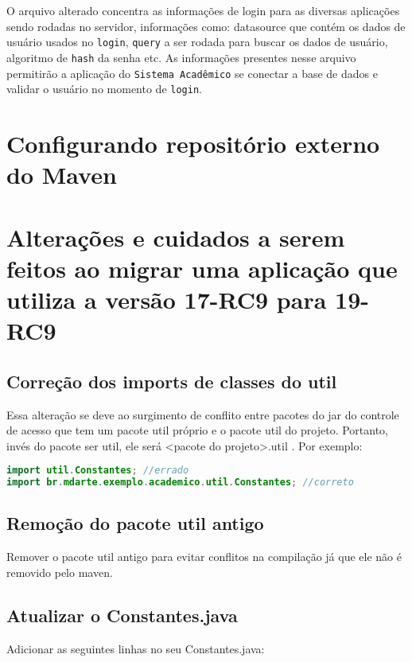 \begin{framed}
	
\end{framed}

O arquivo alterado concentra as informações de login para as diversas aplicações
sendo rodadas no servidor, informações como: datasource que contém os dados de
usuário usados no \texttt{login}, \texttt{query} a ser rodada para buscar os
dados de usuário, algoritmo de \texttt{hash} da senha etc. As informações
presentes nesse arquivo permitirão a aplicação do \texttt{Sistema Acadêmico} se
conectar a base de dados e validar o usuário no momento de \texttt{login}.

\chapter{Configurando repositório externo do Maven}
\label{maven-config}

\chapter{Alterações e cuidados a serem feitos ao migrar uma aplicação que
utiliza a versão 17-RC9 para 19-RC9}

\section{Correção dos imports de classes do util}
Essa alteração se deve ao surgimento de conflito entre pacotes do jar do
controle de acesso que tem um pacote util próprio e o pacote util do projeto. Portanto, invés do pacote ser util, ele será <pacote do projeto>.util . Por exemplo:

\begin{framed}
\begin{lstlisting}[language=java]
import util.Constantes; //errado
import br.mdarte.exemplo.academico.util.Constantes; //correto
\end{lstlisting}
\end{framed}

\section{Remoção do pacote util antigo}
Remover o pacote util antigo para evitar conflitos na compilação já que ele não
é removido pelo maven.

\section{Atualizar o Constantes.java}
Adicionar as seguintes linhas no seu Constantes.java:

